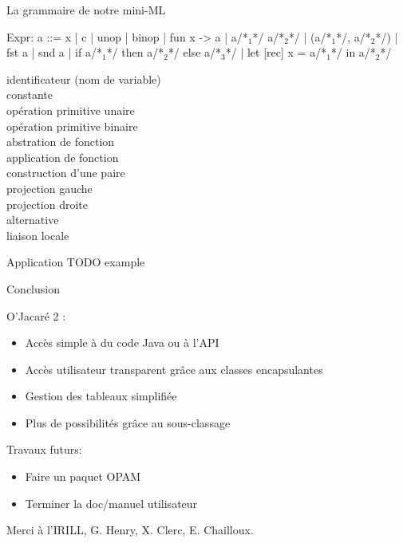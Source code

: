 \documentclass[xcolor={table,dvipsnames}]{beamer}
\begin{document}
\begin{frame}[fragile]{La grammaire de notre mini-ML}
 \begin{multicols}{2}
\begin{OCaml}
Expr: a ::= x
 | c
 | unop
 | binop
 | fun x -> a 
 | a/*$_1$*/ a/*$_2$*/ 
 | (a/*$_1$*/, a/*$_2$*/)
 | fst a
 | snd a
 | if a/*$_1$*/ then a/*$_2$*/ else a/*$_3$*/
 | let [rec] x = a/*$_1$*/ in a/*$_2$*/
\end{OCaml}
\noindent\small
identificateur (nom de variable)\\
constante\\
opération primitive unaire\\
opération primitive binaire\\
abstration de fonction\\
application de fonction\\
construction d'une paire\\
projection gauche\\
projection droite\\
alternative\\
liaison locale
\end{multicols}
\end{frame}













\begin{frame}{}

\end{frame}











\begin{frame}{Application}
TODO example
\end{frame}


\begin{frame}{Conclusion}

O'Jacaré 2 :
\begin{itemize}
\item Accès simple à du code Java ou à l'API
\item Accès utilisateur transparent grâce aux classes encapsulantes
\item Gestion des tableaux simplifiée
\item Plus de possibilités grâce au sous-classage
\end{itemize}

Travaux futurs:
\begin{itemize}
\item Faire un paquet OPAM
\item Terminer la doc/manuel utilisateur
\end{itemize}
\bigskip
Merci à l'IRILL, G. Henry, X. Clerc, E. Chailloux.
\end{frame}
\end{document}
